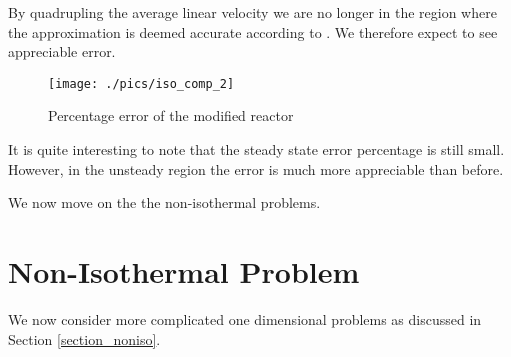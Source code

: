 \documentclass[11pt,fleqn]{article}
\theoremstyle{defstyle}
\begin{document}
By quadrupling the average linear velocity we are no longer in the region where the approximation is deemed accurate according to \cite{washington}. We therefore expect to see appreciable error. 
\begin{figure}[H] 
\centering
\texttt{[image: ./pics/iso\_comp\_2]}
\caption{Percentage error of the modified reactor} 
\label{fig_isocomp2}
\end{figure}
It is quite interesting to note that the steady state error percentage is still small. However, in the unsteady region the error is much more appreciable than before. 

We now move on the the non-isothermal problems.

\section{Non-Isothermal Problem}

We now consider more complicated one dimensional problems as discussed in Section \ref{section_noniso}.
\end{document}

